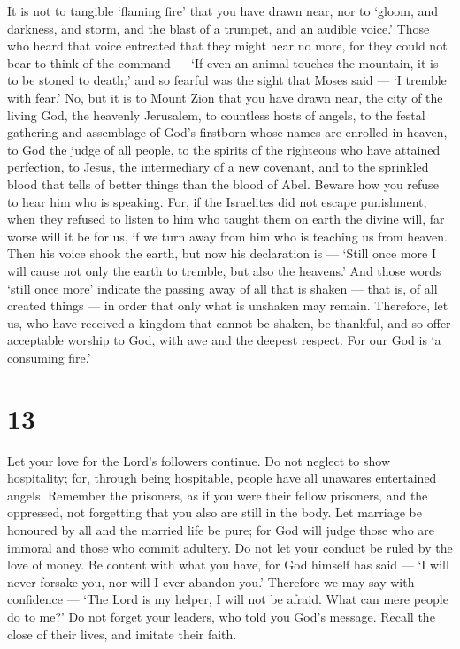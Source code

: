  It is not to tangible `flaming fire' that you have drawn
near, nor to `gloom, and darkness, and storm,  and the
blast of a trumpet, and an audible voice.' Those who heard that voice
entreated that they might hear no more,  for they could not
bear to think of the command --- `If even an animal touches the
mountain, it is to be stoned to death;'  and so fearful was
the sight that Moses said --- `I tremble with fear.'  No,
but it is to Mount Zion that you have drawn near, the city of the living
God, the heavenly Jerusalem, to countless hosts of angels, 
to the festal gathering and assemblage of God's firstborn whose names
are enrolled in heaven, to God the judge of all people, to the spirits
of the righteous who have attained perfection,  to Jesus,
the intermediary of a new covenant, and to the sprinkled blood that
tells of better things than the blood of Abel.  Beware how
you refuse to hear him who is speaking. For, if the Israelites did not
escape punishment, when they refused to listen to him who taught them on
earth the divine will, far worse will it be for us, if we turn away from
him who is teaching us from heaven.  Then his voice shook
the earth, but now his declaration is --- `Still once more I will cause
not only the earth to tremble, but also the heavens.'  And
those words `still once more' indicate the passing away of all that is
shaken --- that is, of all created things --- in order that only what is
unshaken may remain.  Therefore, let us, who have received
a kingdom that cannot be shaken, be thankful, and so offer acceptable
worship to God, with awe and the deepest respect.  For our
God is `a consuming fire.'

\hypertarget{section-12}{%
\section{13}\label{section-12}}

 Let your love for the Lord's followers continue.
 Do not neglect to show hospitality; for, through being
hospitable, people have all unawares entertained angels. 
Remember the prisoners, as if you were their fellow prisoners, and the
oppressed, not forgetting that you also are still in the body.
 Let marriage be honoured by all and the married life be
pure; for God will judge those who are immoral and those who commit
adultery.  Do not let your conduct be ruled by the love of
money. Be content with what you have, for God himself has said --- `I
will never forsake you, nor will I ever abandon you.' 
Therefore we may say with confidence --- `The Lord is my helper, I will
not be afraid. What can mere people do to me?'  Do not
forget your leaders, who told you God's message. Recall the close of
their lives, and imitate their faith.

